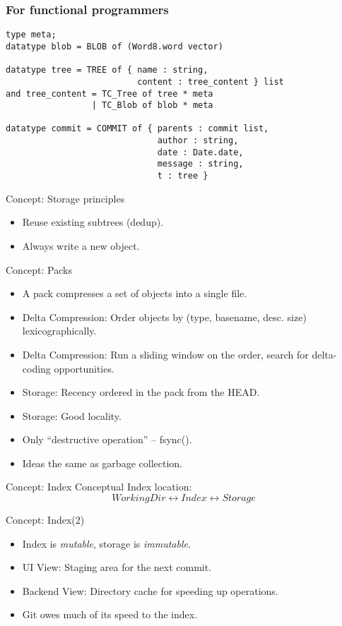 \documentclass[xcolor=pdftex,dvipsnames]{beamer}
\begin{document}
\begin{frame}[fragile]
  \frametitle{For functional programmers}
\begin{verbatim}
type meta;
datatype blob = BLOB of (Word8.word vector)

datatype tree = TREE of { name : string,
                          content : tree_content } list
and tree_content = TC_Tree of tree * meta
                 | TC_Blob of blob * meta

datatype commit = COMMIT of { parents : commit list,
                              author : string,
                              date : Date.date,
                              message : string,
                              t : tree }
\end{verbatim}
\end{frame}
\begin{frame}{Concept: Storage principles}
  \begin{itemize}
  \item Reuse existing subtrees (dedup).
  \item Always write a new object.
  \end{itemize}
\end{frame}
\begin{frame}{Concept: Packs}
  \begin{itemize}
  \item A pack compresses a set of objects into a single file.
  \item Delta Compression: Order objects by (type, basename,
    desc. size) lexicographically.
  \item Delta Compression: Run a sliding window on the order, search
    for delta-coding opportunities.
  \item Storage: Recency ordered in the pack from the HEAD.
  \item Storage: Good locality.
  \item Only ``destructive operation'' -- fsync().
  \item Ideas the same as garbage collection.
  \end{itemize}
\end{frame}
\begin{frame}{Concept: Index}
Conceptual Index location:
$$
  WorkingDir \leftrightarrow Index \leftrightarrow Storage
$$
\end{frame}
\begin{frame}{Concept: Index(2)}
  \begin{itemize}
  \item Index is \emph{mutable}, storage is \emph{immutable}.
  \item UI View: Staging area for the next commit.
  \item Backend View: Directory cache for speeding up operations.
  \item Git owes much of its speed to the index.
  \end{itemize}
\end{frame}
\end{document}
